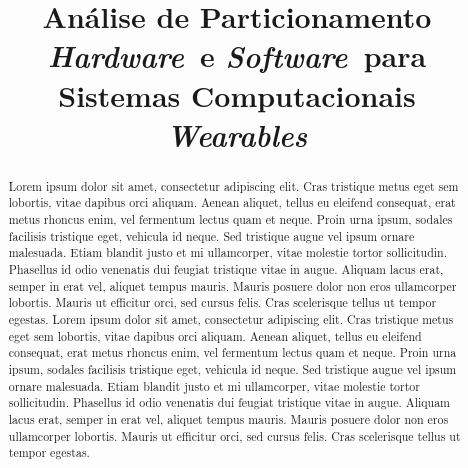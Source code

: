 \documentclass[conference,compsoc]{IEEEtran}
\newcommand{\Hardware }{\textit{Hardware}}
\newcommand{\Software }{\textit{Software}}
\newcommand{\Wearables}{\textit{Wearables}}
\begin{document}
%
\title{Análise de Particionamento \Hardware\ e \Software\ para \\ Sistemas Computacionais \Wearables}


\author{
\and
{}
}


\maketitle

\begin{abstract}
Lorem ipsum dolor sit amet, consectetur adipiscing elit. Cras tristique metus eget sem lobortis, vitae dapibus orci aliquam. Aenean aliquet, tellus eu eleifend consequat, erat metus rhoncus enim, vel fermentum lectus quam et neque. Proin urna ipsum, sodales facilisis tristique eget, vehicula id neque. Sed tristique augue vel ipsum ornare malesuada. Etiam blandit justo et mi ullamcorper, vitae molestie tortor sollicitudin. Phasellus id odio venenatis dui feugiat tristique vitae in augue. Aliquam lacus erat, semper in erat vel, aliquet tempus mauris. Mauris posuere dolor non eros ullamcorper lobortis. Mauris ut efficitur orci, sed cursus felis. Cras scelerisque tellus ut tempor egestas. Lorem ipsum dolor sit amet, consectetur adipiscing elit. Cras tristique metus eget sem lobortis, vitae dapibus orci aliquam. Aenean aliquet, tellus eu eleifend consequat, erat metus rhoncus enim, vel fermentum lectus quam et neque. Proin urna ipsum, sodales facilisis tristique eget, vehicula id neque. Sed tristique augue vel ipsum ornare malesuada. Etiam blandit justo et mi ullamcorper, vitae molestie tortor sollicitudin. Phasellus id odio venenatis dui feugiat tristique vitae in augue. Aliquam lacus erat, semper in erat vel, aliquet tempus mauris. Mauris posuere dolor non eros ullamcorper lobortis. Mauris ut efficitur orci, sed cursus felis. Cras scelerisque tellus ut tempor egestas. 
\end{abstract}
\end{document}
